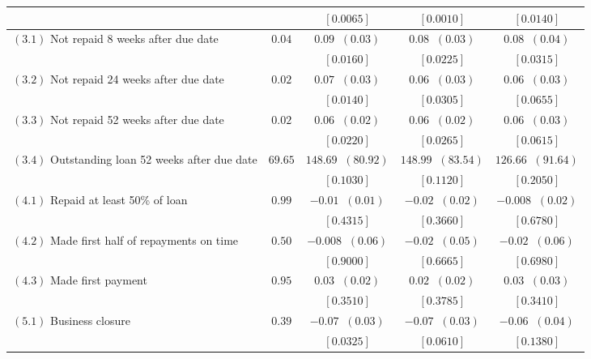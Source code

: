 \begin{table}[!ht]
\begin{center}
\begin{tabular}{l|c@{\hskip 10pt}|c@{\hskip 10pt}|c@{\hskip 10pt}|c}
 &  & $ [ \mathbf { 0.0065 }  ] $ & $ [ \mathbf { 0.0010 }  ] $ & $ [ \mathbf { 0.0140 }  ] $ \\ \hline
\hline
 $ (3.1) $ Not repaid 8 weeks after due date & $ 0.04 $  & $ 0.09 \;\; ( 0.03 ) $  & $ 0.08 \;\; ( 0.03 ) $  & $ 0.08 \;\; ( 0.04 ) $ \\ [-1mm]
 &  & $ [ \mathbf { 0.0160 }  ] $ & $ [ \mathbf { 0.0225 }  ] $ & $ [ \mathbf { 0.0315 }  ] $ \\ \hline
 $ (3.2) $ Not repaid 24 weeks after due date & $ 0.02 $  & $ 0.07 \;\; ( 0.03 ) $  & $ 0.06 \;\; ( 0.03 ) $  & $ 0.06 \;\; ( 0.03 ) $ \\ [-1mm]
 &  & $ [ \mathbf { 0.0140 }  ] $ & $ [ \mathbf { 0.0305 }  ] $ & $ [ \mathbf { 0.0655 }  ] $ \\ \hline
 $ (3.3) $ Not repaid 52 weeks after due date & $ 0.02 $  & $ 0.06 \;\; ( 0.02 ) $  & $ 0.06 \;\; ( 0.02 ) $  & $ 0.06 \;\; ( 0.03 ) $ \\ [-1mm]
 &  & $ [ \mathbf { 0.0220 }  ] $ & $ [ \mathbf { 0.0265 }  ] $ & $ [ \mathbf { 0.0615 }  ] $ \\ \hline
 $ (3.4) $ Outstanding loan 52 weeks after due date & $ 69.65 $  & $ 148.69 \;\; ( 80.92 ) $  & $ 148.99 \;\; ( 83.54 ) $  & $ 126.66 \;\; ( 91.64 ) $ \\ [-1mm]
 &  & $ [0.1030 ] $ & $ [0.1120 ] $ & $ [0.2050 ] $ \\ \hline
\hline
 $ (4.1) $ Repaid at least 50\% of loan & $ 0.99 $  & $ -0.01 \;\; ( 0.01 ) $  & $ -0.02 \;\; ( 0.02 ) $  & $ -0.008 \;\; ( 0.02 ) $ \\ [-1mm]
 &  & $ [0.4315 ] $ & $ [0.3660 ] $ & $ [0.6780 ] $ \\ \hline
 $ (4.2) $ Made first half of repayments on time & $ 0.50 $  & $ -0.008 \;\; ( 0.06 ) $  & $ -0.02 \;\; ( 0.05 ) $  & $ -0.02 \;\; ( 0.06 ) $ \\ [-1mm]
 &  & $ [0.9000 ] $ & $ [0.6665 ] $ & $ [0.6980 ] $ \\ \hline
 $ (4.3) $ Made first payment & $ 0.95 $  & $ 0.03 \;\; ( 0.02 ) $  & $ 0.02 \;\; ( 0.02 ) $  & $ 0.03 \;\; ( 0.03 ) $ \\ [-1mm]
 &  & $ [0.3510 ] $ & $ [0.3785 ] $ & $ [0.3410 ] $ \\ \hline
\hline
 $ (5.1) $ Business closure & $ 0.39 $  & $ -0.07 \;\; ( 0.03 ) $  & $ -0.07 \;\; ( 0.03 ) $  & $ -0.06 \;\; ( 0.04 ) $ \\ [-1mm]
 &  & $ [ \mathbf { 0.0325 }  ] $ & $ [ \mathbf { 0.0610 }  ] $ & $ [0.1380 ] $ \\ \hline

\end{tabular}
\end{center}
\end{table}
